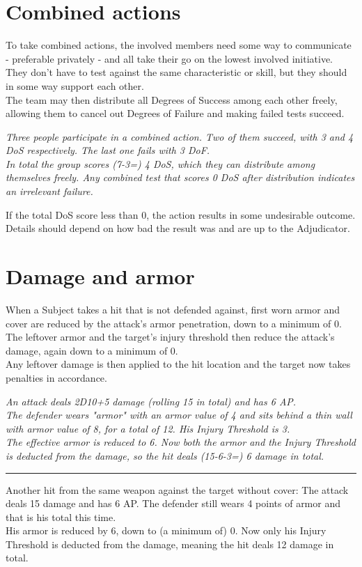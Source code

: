 \section{Combined actions}
\label{combinedaction}
To take combined actions, the involved members need some way to communicate - preferable privately - and all take their go on the lowest involved initiative. They don't have to test against the same characteristic or skill, but they should in some way support each other.\\
The team may then distribute all Degrees of Success among each other freely, allowing them to cancel out Degrees of Failure and making failed tests succeed.
\begin{exampleblock}
	\itshape
	Three people participate in a combined action. Two of them succeed, with 3 and 4 DoS respectively. The last one fails with 3 DoF.\\
	In total the group scores (7-3=) 4 DoS,
		which they can distribute among themselves freely.
	Any combined test that scores 0 DoS after distribution indicates an irrelevant failure.
\end{exampleblock}
If the total DoS score less than 0,
	the action results in some undesirable outcome.
Details should depend on how bad the result was
	and are up to the Adjudicator.
\section{Damage and armor}
When a Subject takes a hit that is not defended against,
	first worn armor and cover are reduced by the attack's armor penetration,
	down to a minimum of 0.
\\%
The leftover armor and the target’s injury threshold then reduce the attack’s damage, again down to a minimum of 0. \\
Any leftover damage is then applied to the hit location
	and the target now takes penalties in accordance.
\begin{exampleblock}
	\itshape
	An attack deals 2D10+5 damage (rolling 15 in total) and has 6 AP.\\
	The defender wears "armor" with an armor value of 4 and sits behind a thin wall with armor value of 8, for a total of 12. His Injury Threshold is 3.\\
	The effective armor is reduced to 6. Now both the armor and the Injury Threshold is deducted from the damage, so the hit deals (15-6-3=) 6 damage in total.
	\par
	\vspace{2mm}
	\hrule
	\vspace{2mm}
	Another hit from the same weapon against the target without cover:
	The attack deals 15 damage and has 6 AP.
	The defender still wears 4 points of armor and that is his total this time.
	\\%
	His armor is reduced by 6, down to (a minimum of) 0.
	Now only his Injury Threshold is deducted from the damage,
		meaning the hit deals 12 damage in total.
\end{exampleblock}
